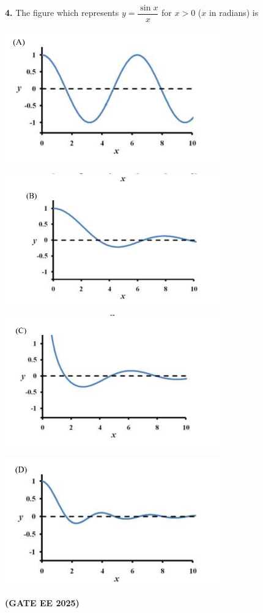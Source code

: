 \documentclass[journal,12pt,onecolumn]{IEEEtran}
\newcommand{\brak}[1]{(#1)}
\begin{document}
\newpage
\noindent\textbf{4.} The figure which represents $y=\dfrac{\sin x}{x}$ for $x>0$ \brak{$x$ in radians} is

\begin{center}
\includegraphics[width=0.7\textwidth]{figs/4a.png}
\end{center}

\begin{center}
\includegraphics[width=0.7\textwidth]{figs/4b.png}
\end{center}

\begin{center}
\includegraphics[width=0.7\textwidth]{figs/4c.png}
\end{center}

\begin{center}
\includegraphics[width=0.7\textwidth]{figs/4d.png}
\end{center}
\hfill \textbf{\brak{GATE EE 2025}}
\end{document}
